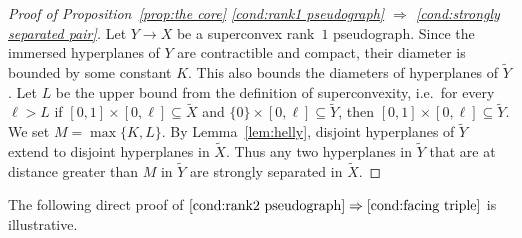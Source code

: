\documentclass[12pt,oneside]{amsart}
\theoremstyle{definition}
\theoremstyle{definition}
\theoremstyle{remark}
\begin{document}
\begin{proof}[Proof of Proposition~\ref{prop:the core} \eqref{cond:rank1 pseudograph} $\Rightarrow$ \eqref{cond:strongly separated pair}]
 Let $Y \rightarrow X$ be a superconvex rank~$1$ pseudograph. Since the immersed hyperplanes of $Y$ are contractible and compact, their diameter is bounded by some constant $K$. This  also bounds  the diameters of  hyperplanes of $\widetilde Y$.
 Let $L$ be the upper bound from the definition of superconvexity, i.e.\ for every $\ell>L$ if $[0,1]\times[0,\ell]\subseteq \widetilde X$ and  $\{0\}\times[0,\ell]\subseteq \widetilde Y$, then 
$[0,1]\times[0,\ell]\subseteq \widetilde Y$. We set $M = \max\{K,L\}$.
By Lemma~\ref{lem:helly}, disjoint hyperplanes of $\widetilde Y$ extend to disjoint hyperplanes in $\widetilde X$. 
Thus any two hyperplanes in $\widetilde Y$ that are at distance greater than $M$ in $\widetilde Y$ are strongly separated in $\widetilde X$.
\end{proof}

The following direct proof of $\eqref{cond:rank2 pseudograph} \Rightarrow \eqref{cond:facing triple}$ is illustrative.
\end{document}
